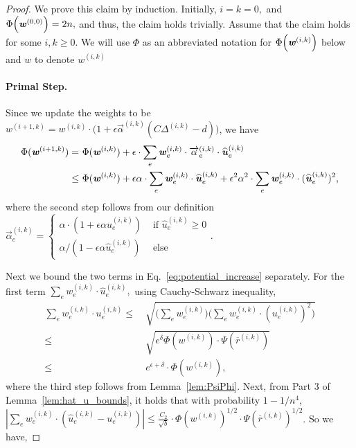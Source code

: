 \documentclass[11pt]{article}
\let\originalleft\left
\let\originalright\right
\renewcommand{\left}{\mathopen{}\mathclose\bgroup\originalleft}
\renewcommand{\right}{\aftergroup\egroup\originalright}
\newcommand\dd{\boldsymbol{\mathit{d}}}
\newcommand\uu{\boldsymbol{\mathit{u}}}
\newcommand\ww{\boldsymbol{\mathit{w}}}
\newcommand\rrbar{\overline{\boldsymbol{\mathit{r}}}}
\newcommand\CC{\boldsymbol{\mathit{C}}}
\newcommand{\wh}{\widehat}
\begin{document}
\begin{proof}
  We prove this claim by induction. Initially, $i = k = 0,$ and $\Phi\left(\ww^{(0,0)}\right) =2 n,$ and thus, the claim holds trivially. Assume that the claim holds for some $i,k \ge 0.$
We will use $\Phi$ as an abbreviated notation for $\Phi\left(\ww^{(i,k)}\right)$ below and $\ww$ to denote $\ww^{(i,k)}$
\paragraph*{Primal Step.} 
Since we update the weights to be $\ww^{(i+1,k)} = \ww^{(i,k)} \cdot \big(1 + \epsilon\overrightarrow{\alpha}^{(i,k)} (\CC \Delta^{(i,k)} - \dd)\big)$, we have
\begin{align}\label{eq:potential_increase}
\Phi(\ww^{(i+1,k)}) = &~ \Phi(\ww^{(i,k)}) + \epsilon \cdot \sum_e \ww^{(i,k)}_e \cdot \overrightarrow{\alpha}^{(i,k)}_e \cdot \wh{\uu}^{(i,k)}_e \notag \\
\leq &~ \Phi(\ww^{(i,k)}) + \epsilon\alpha \cdot \sum_e \ww^{(i,k)}_e \cdot \wh{\uu}^{(i,k)}_e + \epsilon^2\alpha^2 \cdot \sum_{e} \ww^{(i,k)}_e \cdot (\wh{\uu}^{(i,k)}_e)^2,
\end{align}
where the second step follows from our definition $\overrightarrow{\alpha}^{(i,k)}_e = \begin{cases}
\alpha \cdot (1 + \epsilon\alpha \wh{\uu}^{(i,k)}_e) & \text{ if } \wh{\uu}^{(i,k)}_e \geq 0\\
\alpha / (1 - \epsilon\alpha \wh{\uu}^{(i,k)}_e) & \text{ else }
\end{cases}$.

Next we bound the two terms in Eq.~\eqref{eq:potential_increase} separately. For the first term $\sum_e \ww_e^{(i,k)} \cdot \wh{\uu}_e^{(i,k)},$ using Cauchy-Schwarz inequality, 
\begin{align*}
\sum_e \ww_e^{(i,k)} \cdot \uu_e^{(i,k)} \leq &~ \sqrt{\Big(\sum_e \ww_e^{(i,k)} \Big) \Big(\sum_e \ww_e^{(i,k)} \cdot (\uu_e^{(i,k)})^2\Big)} \\
\leq &~ \sqrt{e^{\delta}\Phi(\ww^{(i,k)}) \cdot \Psi(\rrbar^{(i,k)})} \\
\leq &~  e^{\epsilon+\delta} \cdot \Phi(\ww^{(i,k)}),
\end{align*}
where the third step follows from Lemma~\ref{lem:PsiPhi}. Next, from Part 3 of Lemma~\ref{lem:hat_u_bounds}, it holds that with probability $1-1/n^4$, $| \sum_e \ww_e^{(i,k)} \cdot (\wh{\uu}^{(i,k)}_e - \uu^{(i,k)}_e)| \leq \frac{C_2}{\sqrt{b}} \cdot \Phi(\ww^{(i,k)})^{1/2} \cdot \Psi(\rrbar^{(i,k)})^{1/2}$. So we have,


\end{proof}
\end{document}
